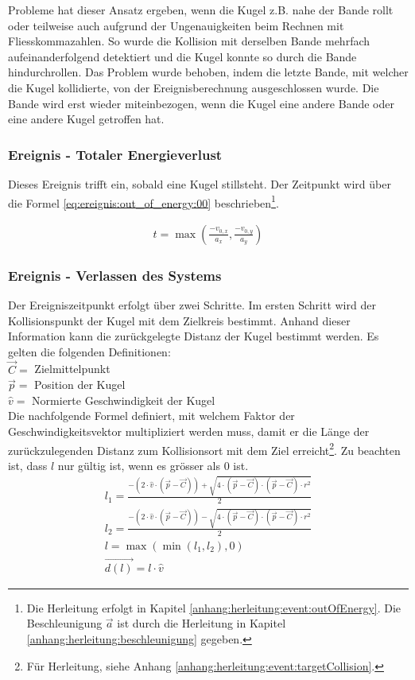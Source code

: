Probleme hat dieser Ansatz ergeben, wenn die Kugel z.B. nahe der Bande rollt oder teilweise auch aufgrund der Ungenauigkeiten
beim Rechnen mit Fliesskommazahlen. So wurde die Kollision mit derselben Bande mehrfach aufeinanderfolgend detektiert und
die Kugel konnte so durch die Bande hindurchrollen. Das Problem wurde behoben, indem
die letzte Bande, mit welcher die Kugel kollidierte, von der Ereignisberechnung ausgeschlossen wurde. Die Bande wird
erst wieder miteinbezogen, wenn die Kugel eine andere Bande oder eine andere Kugel getroffen hat.

\subsubsection{Ereignis - Totaler Energieverlust}
Dieses Ereignis trifft ein, sobald eine Kugel stillsteht. Der Zeitpunkt wird über die Formel \ref{eq:ereignis:out_of_energy:00}
beschrieben\footnote{Die Herleitung erfolgt in Kapitel \ref{anhang:herleitung:event:outOfEnergy}.
Die Beschleunigung $\vec{a}$ ist durch die Herleitung in Kapitel \ref{anhang:herleitung:beschleunigung}
gegeben.}.

\begin{align}
    t = \max{(\frac{-v_{0,x}}{a_x}, \frac{-v_{0,y}}{a_y})}\label{eq:ereignis:out_of_energy:00}
\end{align}

\subsubsection{Ereignis - Verlassen des Systems}
Der Ereigniszeitpunkt erfolgt über zwei Schritte. Im ersten Schritt wird der Kollisionspunkt der Kugel mit dem
Zielkreis bestimmt. Anhand dieser Information kann die zurückgelegte Distanz der Kugel bestimmt werden.
Es gelten die folgenden Definitionen:\\
$\vec{C} = $ Zielmittelpunkt\\
$\vec{p} = $ Position der Kugel\\
$\hat{v} = $ Normierte Geschwindigkeit der Kugel\\

Die nachfolgende Formel definiert, mit welchem Faktor der Geschwindigkeitsvektor multipliziert werden muss, damit
er die Länge der zurückzulegenden Distanz zum Kollisionsort mit dem Ziel erreicht\footnote{
Für Herleitung, siehe Anhang \ref{anhang:herleitung:event:targetCollision}.}. Zu beachten ist, dass $l$ nur gültig ist,
wenn es grösser als $0$ ist.
\begin{align}
    l_1 = \frac{-(2 \cdot \hat{v} \cdot (\vec{p} - \vec{C})) + \sqrt{4 \cdot (\vec{p} - \vec{C}) \cdot (\vec{p} - \vec{C}) \cdot r^2}}{2}\\
    l_2 = \frac{-(2 \cdot \hat{v} \cdot (\vec{p} - \vec{C})) - \sqrt{4 \cdot (\vec{p} - \vec{C}) \cdot (\vec{p} - \vec{C}) \cdot r^2}}{2}\\
    l = \max{(\min{(l_1, l_2)}, 0)}\\
    \vec{d(l)} = l \cdot \hat{v}
\end{align}

